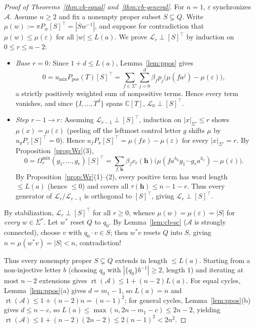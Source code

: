 \documentclass[11pt,a4paper]{article}
\theoremstyle{definition}
\theoremstyle{remark}
\newcommand{\rt}{\operatorname{rt}}
\newcommand{\C}{\mathbb{C}}
\newcommand{\cA}{\mathcal{A}}
\newcommand{\cL}{\mathcal{L}}
\newcommand{\ind}[1]{[#1]}
\begin{document}
\begin{proof}[Proof of Theorems~\ref{thm:cb-equal} and~\ref{thm:cb-general}]
For $n = 1$, $\varepsilon$ synchronizes $\cA$. Assume $n \ge 2$ and fix a nonempty proper subset $S \subsetneq Q$. Write $\mu(w) := \pi P_w \ind{S}^\top = |S w^{-1}|$, and suppose for contradiction that $\mu(w) \le \mu(\varepsilon)$ for all $|w| \le L(a)$. We prove $\cL_r \perp \ind{S}^\top$ by induction on $0 \le r \le n - 2$:
\begin{itemize}[nosep]
  \item \emph{Base $r = 0$:} Since $1 + d \le L(a)$, Lemma~\ref{lem:ppos} gives
  \[
    0 = u_{\mathrm{mix}} P_{\mathrm{pos}}(T)\ind{S}^\top = \sum_{f \in \Sigma'} \sum_{j=0}^d \beta_f p_j \bigl(\mu(f a^j) - \mu(\varepsilon)\bigr),
  \]
  a strictly positively weighted sum of nonpositive terms. Hence every term vanishes, and since $\{I, \dots, T^d\}$ spans $\C[T]$, $\cL_0 \perp \ind{S}^\top$.
  \item \emph{Step $r - 1 \to r$:} Assuming $\cL_{r-1} \perp \ind{S}^\top$, induction on $|x|_{\Sigma'} \le r$ shows $\mu(x) = \mu(\varepsilon)$ (peeling off the leftmost control letter $g$ shifts $\mu$ by $u_g P_z \ind{S}^\top = 0$). Hence $u_f P_x \ind{S}^\top = \mu(fx) - \mu(\varepsilon)$ for every $|x|_{\Sigma'} = r$. By Proposition~\ref{prop:Wr}(3),
  \[
    0 = \Omega_r^{\mathrm{mix}}(g_1, \dots, g_r)\ind{S}^\top = \sum_{f, \mathbf{h}} \beta_f c_r(\mathbf{h})\bigl(\mu(f a^{h_0} g_1 \cdots g_r a^{h_r}) - \mu(\varepsilon)\bigr).
  \]
  By Proposition~\ref{prop:Wr}(1)--(2), every positive term has word length $\le L(a)$ (hence $\le 0$) and covers all $\tau(\mathbf{h}) \le n - 1 - r$. Thus every generator of $\cL_r / \cL_{r-1}$ is orthogonal to $\ind{S}^\top$, giving $\cL_r \perp \ind{S}^\top$.
\end{itemize}
By stabilization, $\cL_r \perp \ind{S}^\top$ for all $r \ge 0$, whence $\mu(w) = \mu(\varepsilon) = |S|$ for \emph{every} $w \in \Sigma^*$. Let $w^*$ reset $Q$ to $q_0$. By Lemma~\ref{lem:cb-sc} ($\cA$ is strongly connected), choose $v$ with $q_0 \cdot v \in S$; then $w^* v$ resets $Q$ into $S$, giving $n = \mu(w^* v) = |S| < n$, contradiction!

Thus every nonempty proper $S \subsetneq Q$ extends in length $\le L(a)$. Starting from a non-injective letter $b$ (choosing $q_0$ with $|\{q_0\}b^{-1}| \ge 2$, length $1$) and iterating at most $n - 2$ extensions gives $\rt(\cA) \le 1 + (n-2)L(a)$. For equal cycles, Lemma~\ref{lem:ppos}(a) gives $d = m_1 - 1$, so $L(a) = n$ and $\rt(\cA) \le 1 + (n-2)n = (n-1)^2$; for general cycles, Lemma~\ref{lem:ppos}(b) gives $d \le n - c$, so $L(a) \le \max(n, 2n - m_1 - c) \le 2n - 2$, yielding $\rt(\cA) \le 1 + (n-2)(2n-2) \le 2(n-1)^2 < 2n^2$.
\end{proof}
\end{document}
